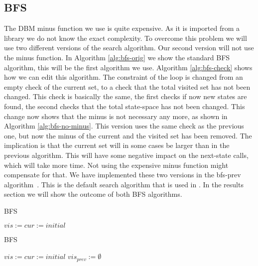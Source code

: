 \subsection{BFS}
\label{subsection:bfs}
The DBM minus function we use is quite expensive. As it is imported from a library we do not know the exact complexity. To overcome this problem we will use two different versions of the search algorithm. Our second version will not use the minus function. In Algorithm \ref{alg:bfs-orig} we show the standard BFS algorithm, this will be the first algorithm we use. Algorithm \ref{alg:bfs-check} shows how we can edit this algorithm. The constraint of the loop is changed from an empty check of the current set, to a check that the total visited set has not been changed. This check is basically the same, the first checks if now new states are found, the second checks that the total state-space has not been changed. This change now shows that the minus is not necessary any more, as shown in Algorithm \ref{alg:bfs-no-minus}. This version uses the same check as the previous one, but now the minus of the current and the visited set has been removed. The implication is that the current set will in some cases be larger than in the previous algorithm. This will have some negative impact on the next-state calls, which will take more time. Not using the expensive minus function might compensate for that. We have implemented these two versions in the bfs-prev algorithm~\cite{rwcmatrices}. This is the default search algorithm that is used in \ltsmin{}. In the results section we will show the outcome of both BFS algorithms. 

\begin{algorithm}
\caption{BFS}\label{alg:bfs-orig}
\begin{algorithmic}[1]
	\State $vis := cur := initial$
	\EndWhile
	
\EndProcedure	
\end{algorithmic}
\end{algorithm}

\begin{algorithm}
\caption{BFS}\label{alg:bfs-check}
\begin{algorithmic}[1]
	\State $vis := cur := initial$
	\State $vis_{prev} := \emptyset$
	\EndWhile
	
\EndProcedure	
\end{algorithmic}
\end{algorithm}

